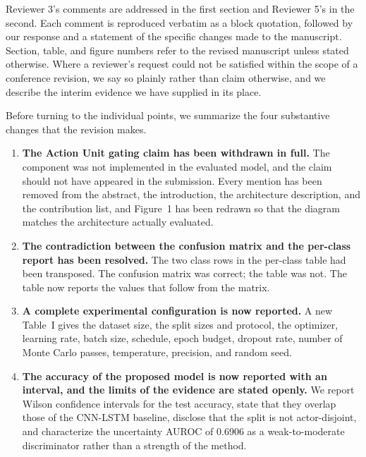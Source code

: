 Reviewer 3's comments are addressed in the first section and Reviewer 5's
in the second. Each comment is reproduced verbatim as a block quotation,
followed by our response and a statement of the specific changes made to
the manuscript. Section, table, and figure numbers refer to the revised
manuscript unless stated otherwise. Where a reviewer's request could not
be satisfied within the scope of a conference revision, we say so plainly
rather than claim otherwise, and we describe the interim evidence we have
supplied in its place.

Before turning to the individual points, we summarize the four
substantive changes that the revision makes.

\begin{singlespace}
\color{changered}
\begin{enumerate}[leftmargin=*,itemsep=0.4\baselineskip]

\item \textbf{The Action Unit gating claim has been withdrawn in full.}
The component was not implemented in the evaluated model, and the claim
should not have appeared in the submission. Every mention has been
removed from the abstract, the introduction, the architecture
description, and the contribution list, and Figure~1 has been redrawn so
that the diagram matches the architecture actually evaluated.

\item \textbf{The contradiction between the confusion matrix and the
per-class report has been resolved.} The two class rows in the per-class
table had been transposed. The confusion matrix was correct; the table
was not. The table now reports the values that follow from the matrix.

\item \textbf{A complete experimental configuration is now reported.}
A new Table~I gives the dataset size, the split sizes and protocol, the
optimizer, learning rate, batch size, schedule, epoch budget, dropout
rate, number of Monte Carlo passes, temperature, precision, and random
seed.

\item \textbf{The accuracy of the proposed model is now reported with an
interval, and the limits of the evidence are stated openly.} We report
Wilson confidence intervals for the test accuracy, state that they
overlap those of the CNN-LSTM baseline, disclose that the split is not
actor-disjoint, and characterize the uncertainty AUROC of 0.6906 as a
weak-to-moderate discriminator rather than a strength of the method.

\end{enumerate}
\end{singlespace}

